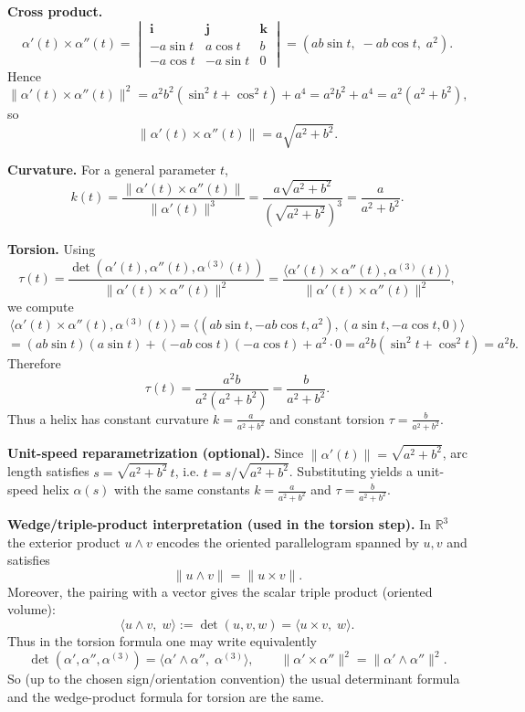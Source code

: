 \documentclass[12pt,a4paper]{article}
\theoremstyle{plain}
\theoremstyle{definition}      %
\begin{document}
	\medskip
	\noindent\textbf{Cross product.}
	\[
	\alpha'(t)\times\alpha''(t)=
	\begin{vmatrix}
		\mathbf i & \mathbf j & \mathbf k\\
		-a\sin t & a\cos t & b\\
		-a\cos t & -a\sin t & 0
	\end{vmatrix}
	=(ab\sin t,\;-ab\cos t,\;a^2).
	\]
	Hence
	\[
	\|\alpha'(t)\times\alpha''(t)\|^2
	=a^2b^2(\sin^2 t+\cos^2 t)+a^4=a^2b^2+a^4=a^2(a^2+b^2),
	\]
	so
	\[
	\|\alpha'(t)\times\alpha''(t)\|=a\sqrt{a^2+b^2}.
	\]
	
	\medskip
	\noindent\textbf{Curvature.}
	For a general parameter $t$,
	\[
	k(t)=\frac{\|\alpha'(t)\times\alpha''(t)\|}{\|\alpha'(t)\|^3}
	=\frac{a\sqrt{a^2+b^2}}{(\sqrt{a^2+b^2})^3}
	=\frac{a}{a^2+b^2}.
	\]
	
	\medskip
	\noindent\textbf{Torsion.}
	Using
	\[
	\tau(t)=\frac{\det(\alpha'(t),\alpha''(t),\alpha^{(3)}(t))}{\|\alpha'(t)\times\alpha''(t)\|^2}
	=\frac{\langle \alpha'(t)\times\alpha''(t),\alpha^{(3)}(t)\rangle}{\|\alpha'(t)\times\alpha''(t)\|^2},
	\]
	we compute
	\[
	\langle \alpha'(t)\times\alpha''(t),\alpha^{(3)}(t)\rangle
	=
	\langle (ab\sin t,-ab\cos t,a^2),(a\sin t,-a\cos t,0)\rangle
	\]
	\[
	=(ab\sin t)(a\sin t)+(-ab\cos t)(-a\cos t)+a^2\cdot 0
	=a^2b(\sin^2 t+\cos^2 t)=a^2b.
	\]
	Therefore
	\[
	\tau(t)=\frac{a^2b}{a^2(a^2+b^2)}=\frac{b}{a^2+b^2}.
	\]
	Thus a helix has constant curvature $k=\frac{a}{a^2+b^2}$ and constant torsion $\tau=\frac{b}{a^2+b^2}$.
	
	\medskip
	\noindent\textbf{Unit-speed reparametrization (optional).}
	Since $\|\alpha'(t)\|=\sqrt{a^2+b^2}$, arc length satisfies $s=\sqrt{a^2+b^2}\,t$, i.e.
	$t=s/\sqrt{a^2+b^2}$. Substituting yields a unit-speed helix $\alpha(s)$ with the same constants
	$k=\frac{a}{a^2+b^2}$ and $\tau=\frac{b}{a^2+b^2}$.
	
	\medskip
	\noindent\textbf{Wedge/triple-product interpretation (used in the torsion step).}
	In $\mathbb{R}^3$ the exterior product $u\wedge v$ encodes the oriented parallelogram spanned by $u,v$ and satisfies
	\[
	\|u\wedge v\|=\|u\times v\|.
	\]
	Moreover, the pairing with a vector gives the scalar triple product (oriented volume):
	\[
	\langle u\wedge v,\;w\rangle := \det(u,v,w)=\langle u\times v,\;w\rangle.
	\]
	Thus in the torsion formula one may write equivalently
	\[
	\det(\alpha',\alpha'',\alpha^{(3)})=\big\langle \alpha'\wedge \alpha'',\;\alpha^{(3)}\big\rangle,
	\qquad
	\|\alpha'\times\alpha''\|^2=\|\alpha'\wedge\alpha''\|^2.
	\]
	So (up to the chosen sign/orientation convention) the usual determinant formula and the wedge-product formula
	for torsion are the same.
	
\end{document}
